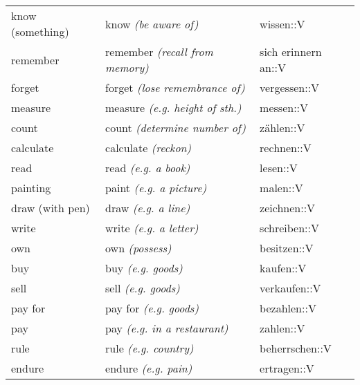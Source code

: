 \begin{center}
\begin{longtable}{lll}
{\sc \lowercase{	KNOW \footnotesize (SOMETHING)	}}	&	know	\textit{\footnotesize (be aware of)}	&	wissen::V	\\
{\sc \lowercase{	REMEMBER	}}	&	remember	\textit{\footnotesize (recall from memory)}	&	sich erinnern an::V	\\
{\sc \lowercase{	FORGET	}}	&	forget	\textit{\footnotesize (lose remembrance of)}	&	vergessen::V	\\
{\sc \lowercase{	MEASURE	}}	&	measure	\textit{\footnotesize (e.g. height of sth.)}	&	messen::V	\\
{\sc \lowercase{	COUNT	}}	&	count	\textit{\footnotesize (determine number of)}	&	zählen::V	\\
{\sc \lowercase{	CALCULATE	}}	&	calculate	\textit{\footnotesize (reckon)}	&	rechnen::V	\\
{\sc \lowercase{	READ	}}	&	read	\textit{\footnotesize (e.g. a book)}	&	lesen::V	\\
{\sc \lowercase{	PAINTING	}}	&	paint	\textit{\footnotesize (e.g. a picture)}	&	malen::V	\\
{\sc \lowercase{	DRAW \footnotesize (WITH PEN)	}}	&	draw	\textit{\footnotesize (e.g. a line)}	&	zeichnen::V	\\
{\sc \lowercase{	WRITE	}}	&	write	\textit{\footnotesize (e.g. a letter)}	&	schreiben::V	\\
{\sc \lowercase{	OWN	}}	&	own	\textit{\footnotesize (possess)}	&	besitzen::V	\\
{\sc \lowercase{	BUY	}}	&	buy	\textit{\footnotesize (e.g. goods)}	&	kaufen::V	\\
{\sc \lowercase{	SELL	}}	&	sell	\textit{\footnotesize (e.g. goods)}	&	verkaufen::V	\\
{\sc \lowercase{	PAY FOR	}}	&	pay for	\textit{\footnotesize (e.g. goods)}	&	bezahlen::V	\\
{\sc \lowercase{	PAY	}}	&	pay	\textit{\footnotesize (e.g. in a restaurant)}	&	zahlen::V	\\
{\sc \lowercase{	RULE	}}	&	rule	\textit{\footnotesize (e.g. country)}	&	beherrschen::V	\\
{\sc \lowercase{	ENDURE	}}	&	endure	\textit{\footnotesize (e.g. pain)}	&	ertragen::V	\\

\end{longtable}
 \addtocounter{table}{-1} 
 
\end{center}

